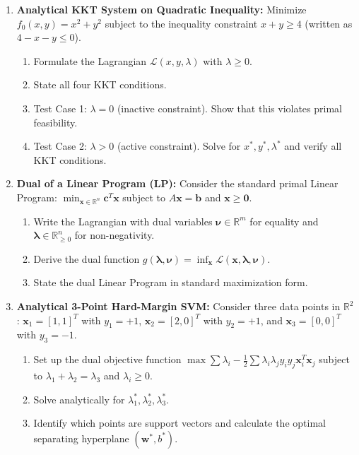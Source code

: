 \begin{enumerate}[label=\textbf{P\arabic*.}]
    \item \textbf{Analytical KKT System on Quadratic Inequality:}
    Minimize $f_0(x, y) = x^2 + y^2$ subject to the inequality constraint $x + y \ge 4$ (written as $4 - x - y \le 0$).
    \begin{enumerate}[label=(\alph*)]
        \item Formulate the Lagrangian $\mathcal{L}(x, y, \lambda)$ with $\lambda \ge 0$.
        \item State all four KKT conditions.
        \item Test Case 1: $\lambda = 0$ (inactive constraint). Show that this violates primal feasibility.
        \item Test Case 2: $\lambda > 0$ (active constraint). Solve for $x^*, y^*, \lambda^*$ and verify all KKT conditions.
    \end{enumerate}

    \item \textbf{Dual of a Linear Program (LP):}
    Consider the standard primal Linear Program: $\min_{\mathbf{x} \in \mathbb{R}^n} \mathbf{c}^T \mathbf{x}$ subject to $A\mathbf{x} = \mathbf{b}$ and $\mathbf{x} \ge \mathbf{0}$.
    \begin{enumerate}[label=(\alph*)]
        \item Write the Lagrangian with dual variables $\boldsymbol{\nu} \in \mathbb{R}^m$ for equality and $\boldsymbol{\lambda} \in \mathbb{R}^n_{\ge 0}$ for non-negativity.
        \item Derive the dual function $g(\boldsymbol{\lambda}, \boldsymbol{\nu}) = \inf_{\mathbf{x}} \mathcal{L}(\mathbf{x}, \boldsymbol{\lambda}, \boldsymbol{\nu})$.
        \item State the dual Linear Program in standard maximization form.
    \end{enumerate}

    \item \textbf{Analytical 3-Point Hard-Margin SVM:}
    Consider three data points in $\mathbb{R}^2$: $\mathbf{x}_1 = [1, 1]^T$ with $y_1 = +1$, $\mathbf{x}_2 = [2, 0]^T$ with $y_2 = +1$, and $\mathbf{x}_3 = [0, 0]^T$ with $y_3 = -1$.
    \begin{enumerate}[label=(\alph*)]
        \item Set up the dual objective function $\max \sum \lambda_i - \frac{1}{2}\sum \lambda_i \lambda_j y_i y_j \mathbf{x}_i^T \mathbf{x}_j$ subject to $\lambda_1 + \lambda_2 = \lambda_3$ and $\lambda_i \ge 0$.
        \item Solve analytically for $\lambda_1^*, \lambda_2^*, \lambda_3^*$.
        \item Identify which points are support vectors and calculate the optimal separating hyperplane $(\mathbf{w}^*, b^*)$.
    \end{enumerate}


\end{enumerate}
